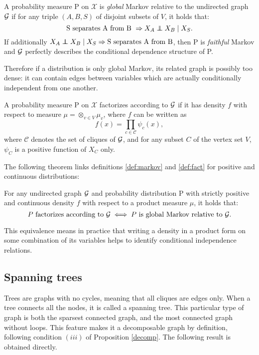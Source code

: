 \begin{definition}\label{def:markov}
A probability measure P on $\mathcal{X}$ is \textit{global} Markov relative to the undirected graph $\mathcal{G}$ if for any triple $(A, B, S)$ of disjoint subsets of $V$, it holds that:
 $$ \text{S separates A from B } \Rightarrow X_A\independent X_B \mid X_S.$$
 If additionally $X_A\independent X_B \mid X_S \Rightarrow \text{S separates A from B}  $, then P is \textit{faithful} Markov and $\mathcal{G}$ perfectly describes the conditional dependence structure of P.
\end{definition}
Therefore if a distribution is only global Markov, its related graph is possibly too dense: it can contain edges between variables which are actually conditionally independent from one another. 
\begin{definition}[Factorization]\label{def:fact}
A probability measure P on $\mathcal{X}$ factorizes according to $\mathcal{G}$ if it has density $f$ with respect to measure $\mu = \otimes_{v\in V} \mu_v$, where $f$ can be written as
$$f(x) = \prod_{c\in \mathcal{C} }\psi_c(x),$$
where $\mathcal{C}$ denotes the set of cliques of $\mathcal{G}$, and for any subset $C$ of the vertex set $V$, $\psi_C$ is a positive function of $X_C$ only.
\end{definition}
The following theorem links definitions \ref{def:markov} and \ref{def:fact} for positive and continuous distributions:

\begin{theorem} \label{thm:ham}
For any undirected graph $\mathcal{G}$ and probability distribution P with strictly positive and continuous density $f$ with respect to a product measure $\mu$, it holds that:
$$P\text{ factorizes according to } \mathcal{G} \iff P\text{ is global Markov relative to }\mathcal{G}. $$
\end{theorem}

This equivalence means in practice that writing a density in a product form on some combination of its variables helps to identify conditional independence relations.

 \subsection{Spanning trees}\label{trees}
Trees are graphs with no cycles, meaning that all cliques are edges only. When a tree connects all the nodes, it is called a spanning tree. This particular type of graph is both the sparsest connected graph, and the most connected graph without loops. This feature makes it a decomposable graph by definition, following condition $(iii)$ of Proposition \ref{decomp}.  The following result is obtained directly.

